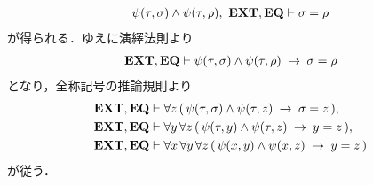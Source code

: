 \begin{sketch}
\begin{description}
				\begin{align}
					\psi(\tau,\sigma) \wedge \psi(\tau,\rho),\ \EXTAX,\EQAX 
					\vdash \sigma = \rho
				\end{align}
				が得られる．ゆえに演繹法則より
				\begin{align}
					\mbox{{\bf EXT}},\mbox{{\bf EQ}} \vdash \psi(\tau,\sigma) \wedge \psi(\tau,\rho)
					\hspace{0.25em}\rightarrow\hspace{0.25em} \sigma = \rho
				\end{align}
				となり，全称記号の推論規則より
				\begin{align}
					\mbox{{\bf EXT}},\mbox{{\bf EQ}} &\vdash \forall z\, 
						(\, \psi(\tau,\sigma) \wedge \psi(\tau,z) 
						\hspace{0.25em}\rightarrow\hspace{0.25em} \sigma = z\, ), \\
					\mbox{{\bf EXT}},\mbox{{\bf EQ}} &\vdash \forall y\, \forall z\, 
						(\, \psi(\tau,y) \wedge \psi(\tau,z) \hspace{0.25em}\rightarrow\hspace{0.25em} y = z\, ), \\
					\mbox{{\bf EXT}},\mbox{{\bf EQ}} &\vdash \forall x\, \forall y\, \forall z\, 
						(\, \psi(x,y) \wedge \psi(x,z) \hspace{0.25em}\rightarrow\hspace{0.25em} y = z\, )
				\end{align}
				が従う．
			

\end{description}
\end{sketch}
